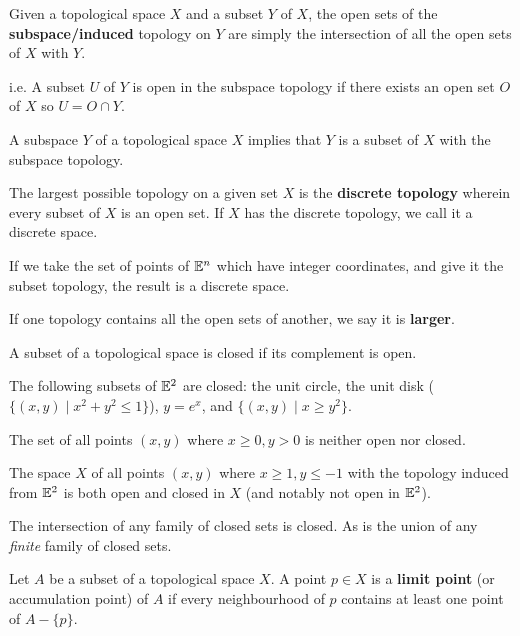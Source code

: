 \begin{definition}
    Given a topological space $X$ and a subset $Y$ of $X$, the open sets of the \textbf{subspace/induced} topology on $Y$ are simply the intersection of all the open sets of $X$ with $Y$.

    i.e. A subset $U$ of $Y$ is open in the subspace topology if there exists an open set $O$ of $X$ so $U = O\cap Y$.

    A subspace $Y$ of a topological space $X$ implies that $Y$ is a subset of $X$ with the subspace topology.
\end{definition}
\begin{definition}
    The largest possible topology on a given set $X$ is the \textbf{discrete topology} wherein every subset of $X$ is an open set. If $X$ has the discrete topology, we call it a discrete space.
\end{definition}
\begin{example}
    If we take the set of points of $\mathbb{E}^n$ which have integer coordinates, and give it the subset topology, the result is a discrete space.
\end{example}
\begin{definition}
    If one topology contains all the open sets of another, we say it is \textbf{larger}.
\end{definition}
\begin{definition}[Closed]
    A subset of a topological space is closed if its complement is open.
\end{definition}
\begin{example}
    The following subsets of $\mathbb{E}^2$ are closed: the unit circle, the unit disk ($\{(x,y) \mid x^2+y^2 \leq 1\}$), $y=e^x$, and $\{(x,y) \mid x \geq y^2\}$.

    The set of all points $(x,y)$ where $x \geq 0, y > 0$ is neither open nor closed.

    The space $X$ of all points $(x,y)$ where $x\geq 1, y \leq -1$ with the topology induced from $\mathbb{E}^2$ is both open and closed in $X$ (and notably not open in $\mathbb{E}^2$).
\end{example}
\begin{remark}
    The intersection of any family of closed sets is closed. As is the union of any \emph{finite} family of closed sets.
\end{remark}
\begin{definition}
    Let $A$ be a subset of a topological space $X$. A point $p \in X$ is a \textbf{limit point} (or accumulation point) of $A$ if every neighbourhood of $p$ contains at least one point of $A - \{p\}$.
\end{definition}
